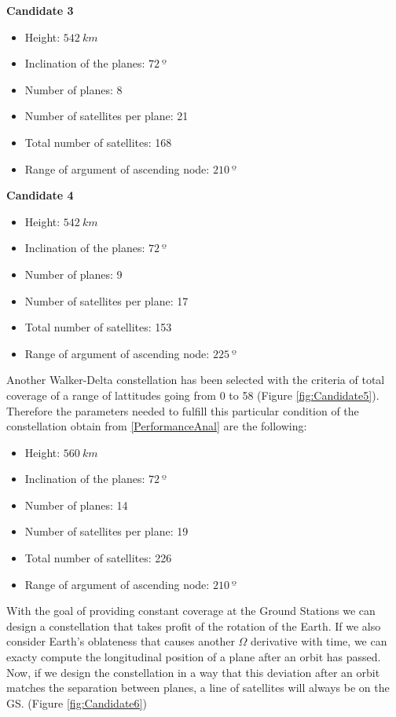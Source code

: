 \textbf{Candidate 3}\\  
\begin{itemize}
\item Height: $542~{km}$ 
\item Inclination of the planes: $72~{º}$  
\item Number of planes: 8
\item Number of satellites per plane: 21
\item Total number of satellites: 168
\item Range of argument of ascending node: $210~{º}$ 
\end{itemize}

\textbf{Candidate 4}\\  
\begin{itemize}
\item Height: $542~{km}$ 
\item Inclination of the planes: $72~{º}$  
\item Number of planes: 9
\item Number of satellites per plane: 17
\item Total number of satellites: 153
\item Range of argument of ascending node: $225~{º}$
\end{itemize}


Another Walker-Delta constellation has been selected with the criteria of total coverage of a range of lattitudes going from 0 to 58 (Figure \ref{fig:Candidate5}). Therefore the parameters needed to fulfill this particular condition of the constellation obtain from \ref{PerformanceAnal} are the following:

\begin{itemize}
	\item Height: $560~{km}$ 
	\item Inclination of the planes: $72~{º}$  
	\item Number of planes: 14
	\item Number of satellites per plane: 19
	\item Total number of satellites: 226
	\item Range of argument of ascending node: $210~{º}$
\end{itemize}



With the goal of providing constant coverage at the Ground Stations we can design a constellation that takes profit of the rotation of the Earth. If we also consider Earth's oblateness that causes another $\Omega$ derivative with time, we can exacty compute the longitudinal position of a plane after an orbit has passed. Now, if we design the constellation in a way that this deviation after an orbit matches the separation between planes, a line of satellites will always be on the GS. (Figure \ref{fig:Candidate6})


